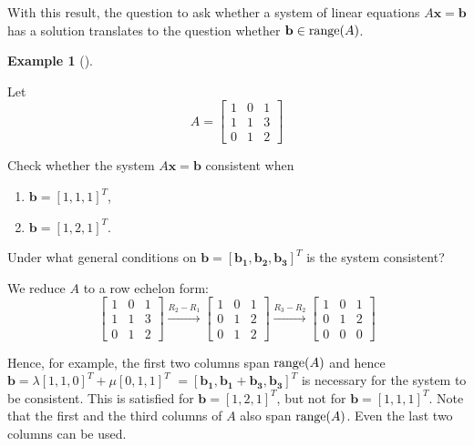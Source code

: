 \documentclass[
  a4paper,
  DIV=11,
  numbers=noendperiod,
  oneside]{scrreprt}
\providecommand{\tightlist}{%
  \setlength{\itemsep}{0pt}\setlength{\parskip}{0pt}}
\theoremstyle{definition}
\newtheorem{example}{Example}[chapter]
\theoremstyle{remark}
\newenvironment{fbx}[3]{\begin{tcolorbox}[enhanced, breakable,%
attach boxed title to top*={xshift=1.4pt},
boxed title style={boxrule=0.0mm, fuzzy shadow={1pt}{-1pt}{0mm}{0.1mm}{gray}, arc=.3em, rounded corners=east, sharp corners=west}, colframe=#1-color2, colbacktitle=#1-color1, colback = white, coltitle=black,  titlerule=0mm, toprule=0pt, bottomrule=.7pt, leftrule=.3em, rightrule=0pt, outer arc=.3em,  arc=0pt,	 sharp corners = east, left=.5em, bottomtitle=1mm, toptitle=1mm,title=\textbf{#2}\hspace{0.5em}{#3}]}
{\end{tcolorbox}}
\begin{document}
With this result, the question to ask whether a system of linear
equations \(A\mathbf{x} = \mathbf{b}\) has a solution translates to the
question whether \(\mathbf{b} \in {\rm range}(A)\).

\begin{example}[]\protect\hypertarget{exm-}{}\label{exm-}

Let \[A = \left[\begin{array}{ccc}
            1 & 0 & 1 \\
            1 & 1 & 3 \\
            0 & 1 & 2
        \end{array}\right]\]

Check whether the system \(A\mathbf{x} = \mathbf{b}\) consistent when

\begin{enumerate}
\def\labelenumi{(\roman{enumi})}
\tightlist
\item
  \(\mathbf{b} = \left[1,1,1\right]^T\),
\item
  \(\mathbf{b} = \left[1,2,1\right]^T\).
\end{enumerate}

Under what general conditions on
\(\mathbf{b} = \left[\mathbf{b_1},\mathbf{b_2},\mathbf{b_3}\right]^T\)
is the system consistent?

\begin{fbx}{Solution}{Solution}{}
\label{}
We reduce \(A\) to a row echelon form:
\[\left[\begin{array}{ccc} 1 & 0 & 1 \\ 1 & 1 & 3 \\ 0 & 1 & 2 \end{array}\right] \xrightarrow{R_2 - R_1} \left[\begin{array}{ccc} 1 & 0 & 1 \\ 0 & 1 & 2 \\ 0 & 1 & 2 \end{array}\right] \xrightarrow{R_3 - R_2} \left[\begin{array}{ccc} 1 & 0 & 1 \\ 0 & 1 & 2 \\ 0 & 0 & 0 \end{array}\right]\]

Hence, for example, the first two columns span \({\rm range}(A)\) and
hence
\(\mathbf{b} = \lambda \left[1,1,0\right]^T + \mu \left[0,1,1\right]^T\)
\(= \left[\mathbf{b_1}, \mathbf{b_1} + \mathbf{b_3}, \mathbf{b_3}\right]^T\)
is necessary for the system to be consistent. This is satisfied for
\(\mathbf{b} = \left[1,2,1\right]^T\), but not for
\(\mathbf{b} = \left[1,1,1\right]^T\). Note that the first and the third
columns of \(A\) also span \({\rm range}(A)\). Even the last two columns
can be used.

\end{fbx}

\end{example}
\end{document}
